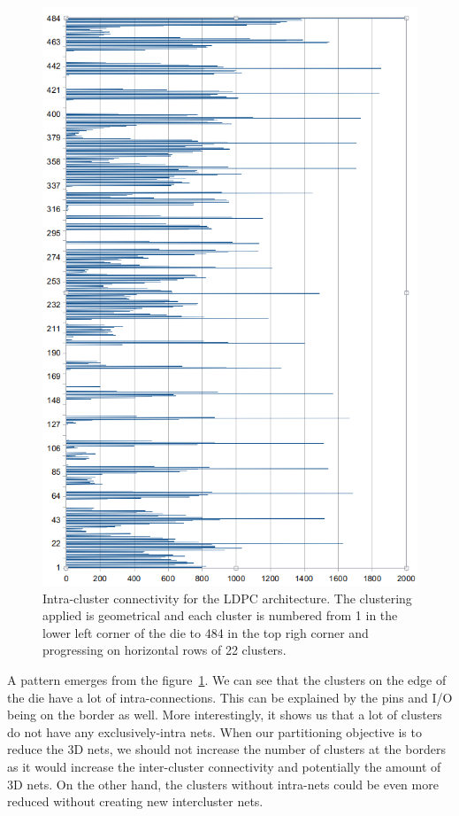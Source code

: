 \documentclass[11pt,a4paper]{report} %
\theoremstyle{customdef}
\begin{document}
\begin{figure}[!h]
\centering
\includegraphics[width=.8\textwidth]{img/intra-clust-con}
\caption{Intra-cluster connectivity for the LDPC architecture. The clustering applied is geometrical and each cluster is numbered from 1 in the lower left corner of the die to 484 in the top righ corner and progressing on horizontal rows of 22 clusters.}
\label{fig:intra-clust-con}
\end{figure}

A pattern emerges from the figure~\ref{fig:intra-clust-con}.
We can see that the clusters on the edge of the die have a lot of intra-connections.
This can be explained by the pins and I/O being on the border as well.
More interestingly, it shows us that a lot of clusters do not have any exclusively-intra nets.
When our partitioning objective is to reduce the 3D nets, we should not increase the number of clusters at the borders as it would increase the inter-cluster connectivity and potentially the amount of 3D nets.
On the other hand, the clusters without intra-nets could be even more reduced without creating new intercluster nets.
\end{document}
